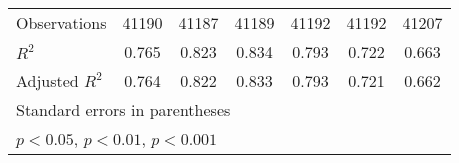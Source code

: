 {\begin{tabular}{l*{6}{c}}
\midrule
Observations        &       41190         &       41187         &       41189         &       41192         &       41192         &       41207         \\
\(R^{2}\)           &       0.765         &       0.823         &       0.834         &       0.793         &       0.722         &       0.663         \\
Adjusted \(R^{2}\)  &       0.764         &       0.822         &       0.833         &       0.793         &       0.721         &       0.662         \\
\bottomrule
\multicolumn{7}{l}{\footnotesize Standard errors in parentheses}\\
\multicolumn{7}{l}{\footnotesize \sym{*} \(p<0.05\), \sym{**} \(p<0.01\), \sym{***} \(p<0.001\)}\\
\end{tabular}
}
